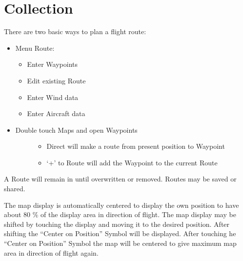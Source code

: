 \documentclass[letterpaper,10pt,english]{sphinxmanual}
\begin{document}
\chapter{Collection}
\label{\detokenize{04-appendix/collection:collection}}\label{\detokenize{04-appendix/collection::doc}}
\sphinxAtStartPar
There are two basic ways to plan a flight route:
\begin{itemize}
\item {} 
\sphinxAtStartPar
Menu \sphinxhyphen{} Route:
\begin{itemize}
\item {} 
\sphinxAtStartPar
Enter Waypoints

\item {} 
\sphinxAtStartPar
Edit existing Route

\item {} 
\sphinxAtStartPar
Enter Wind data

\item {} 
\sphinxAtStartPar
Enter Aircraft data

\end{itemize}

\item {} \begin{description}
\item[{Double touch Maps and open Waypoints}] \leavevmode\begin{itemize}
\item {} 
\sphinxAtStartPar
Direct will make a route from present position to Waypoint

\item {} 
\sphinxAtStartPar
‘+’ to Route will add the Waypoint to the current Route

\end{itemize}

\end{description}

\end{itemize}

\sphinxAtStartPar
A Route will remain in  until overwritten or
removed. Routes may be saved or shared.

\sphinxAtStartPar
The  map display is automatically centered to
display the own position to have about 80 \% of the display area in direction of
flight.  The map display may be shifted by touching the display and moving it to
the desired position. After shifting the “Center on Position” Symbol will be
displayed. After touching he “Center on Position” Symbol the map will be
centered to give maximum map area in direction of flight again.
\end{document}
